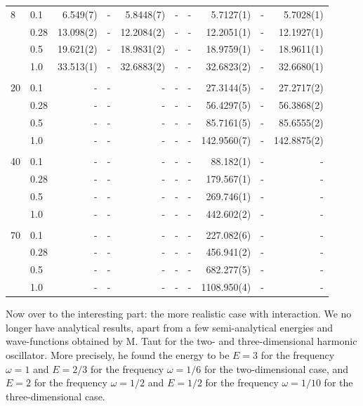 \begin{landscape}
\begin{table} [H]
\begin{tabularx}{\hsize}{l:l|RRRRRRRR}
		8 & 0.1 & 6.549(7) & - & 5.8448(7) & - & - & 5.7127(1) & - & 5.7028(1) \\ 
		& 0.28 & 13.098(2) & - & 12.2084(2) & - & - & 12.2051(1) & - & 12.1927(1) \\
		& 0.5 & 19.621(2) & - & 18.9831(2) & - & - & 18.9759(1) & - & 18.9611(1) \\
		& 1.0 & 33.513(1) & - & 32.6883(2) & - & - & 32.6823(2) & - & 32.6680(1) \\ \hdashline \\
		
		20 & 0.1 & - & - & - & - & - & 27.3144(5) & - & 27.2717(2) \\ 
		& 0.28 & - & - & - & - & - & 56.4297(5) & - & 56.3868(2) \\
		& 0.5 & - & - & - & - & - & 85.7161(5) & - & 85.6555(2) \\
		& 1.0 & - & - & - & - & - & 142.9560(7) & - & 142.8875(2) \\ \hdashline \\
		
		40 & 0.1 & - & - & - & - & - & 88.182(1) & - & - \\ 
		& 0.28 & - & - & - & - & - & 179.567(1) & - & - \\
		& 0.5 & - & - & - & - & - & 269.746(1) & - & - \\
		& 1.0 & - & - & - & - & - & 442.602(2) & - & - \\ \hdashline \\
		
		70 & 0.1 & - & - & - & - & - & 227.082(6) & - & - \\ 
		& 0.28 & - & - & - & - & - & 456.941(2) & - & - \\
		& 0.5 & - & - & - & - & - & 682.277(5) & - & - \\
		& 1.0 & - & - & - & - & - & 1108.950(4) & - & - \\ \hline\hline
	\end{tabularx}
\end{table}
\end{landscape}

Now over to the interesting part: the more realistic case with interaction. We no longer have analytical results, apart from a few semi-analytical energies and wave-functions obtained by M. Taut for the two- and three-dimensional harmonic oscillator. More precisely, he found the energy to be $E=3$ for the frequency $\omega=1$ and $E=2/3$ for the frequency $\omega=1/6$ for the two-dimensional case, and $E=2$ for the frequency $\omega=1/2$ and $E=1/2$ for the frequency $\omega=1/10$ for the three-dimensional case. \cite{taut_two_1993}\cite{taut_two_1994}

